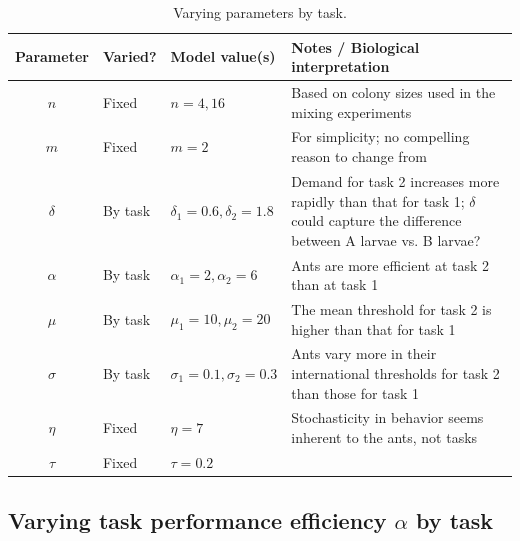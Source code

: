 \documentclass[11pt]{article}
\begin{document}
\begin{appendices}
\begin{table}[H] \small
  \begin{center}
    \begin{tabular}{|c|>{\centering}m{0.65in}|>{\centering}m{1.15in}|m{3.5in}|} 
      \hline
      \textbf{Parameter} & \textbf{Varied?} & \textbf{Model value(s)} & \textbf{Notes / Biological interpretation} \\ \hline
      $n$ & Fixed & $n = 4, 16$ & Based on colony sizes used in the mixing experiments \\ \hline
      $m$ & Fixed & $m = 2$ & For simplicity; no compelling reason to change from \cite{ulrich2018} \\ \hline
      $\delta$ & By task & $\delta_1 = 0.6, \delta_2 = 1.8 $ & Demand for task 2 increases more rapidly than that for task 1; $\delta$ could capture the difference between A larvae vs. B larvae? \\ \hline
      $\alpha$ & By task  & $\alpha_1 = 2,\alpha_2 = 6$ & Ants are more efficient at task 2 than at task 1 \\ \hline
      $\mu$ & By task  & $\mu_1 = 10,\mu_2 = 20 $ & The mean threshold for task 2 is higher than that for task 1\\ \hline
      $\sigma$ & By task & $\sigma_1 = 0.1, \sigma_2 = 0.3$ & Ants vary more in their international thresholds for task 2 than those for task 1 \\ \hline
      $\eta$ & Fixed & $\eta = 7$ & Stochasticity in behavior seems inherent to the ants, not tasks\\ \hline
      $\tau$ & Fixed & $\tau = 0.2$ & 
      \\ \hline
    \end{tabular}
    \caption{Varying parameters by task.}
    \label{tab:table3}
  \end{center}
\end{table}

\subsection{Varying task performance efficiency $\alpha$ by task}


\end{appendices}
\end{document}
